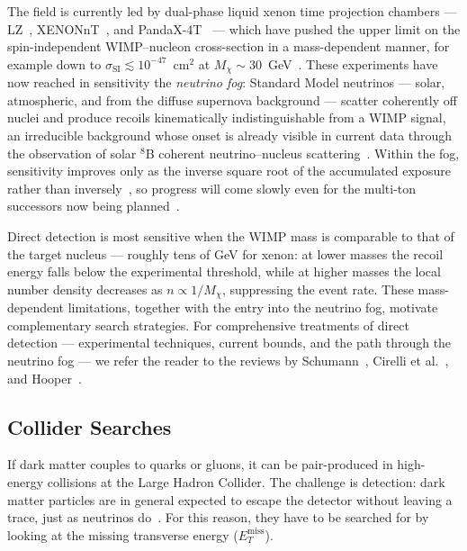 The field is currently led by dual-phase liquid xenon time projection chambers --- LZ~\cite{LZ:2022lsv}, XENONnT~\cite{XENON:2023cxc}, and PandaX-4T~\cite{PandaX-4T:2021bab} --- which have pushed the upper limit on the spin-independent WIMP--nucleon cross-section in a mass-dependent manner, for example down to $\sigma_\text{SI} \lesssim 10^{-47}$~cm$^2$ at $M_\chi \sim 30$~GeV~\cite{LZ:2024zvo}.
These experiments have now reached in sensitivity the \emph{neutrino fog}: Standard Model neutrinos --- solar, atmospheric, and from the diffuse supernova background --- scatter coherently off nuclei and produce recoils kinematically indistinguishable from a WIMP signal, an irreducible background whose onset is already visible in current data through the observation of solar $^8$B coherent neutrino--nucleus scattering~\cite{XENON:2020gfr,PandaX:2024muv,XENON:2024hup,LZ:2024zvo}.
Within the fog, sensitivity improves only as the inverse square root of the accumulated exposure rather than inversely~\cite{OHare:2021utq}, so progress will come slowly even for the multi-ton successors now being planned~\cite{DARWIN:2016hyl}.

Direct detection is most sensitive when the WIMP mass is comparable to that of the target nucleus --- roughly tens of GeV for xenon: at lower masses the recoil energy falls below the experimental threshold, while at higher masses the local number density decreases as $n \propto 1/M_\chi$, suppressing the event rate.
These mass-dependent limitations, together with the entry into the neutrino fog, motivate complementary search strategies.
For comprehensive treatments of direct detection --- experimental techniques, current bounds, and the path through the neutrino fog --- we refer the reader to the reviews by Schumann~\cite{Schumann:2019eaa}, Cirelli et al.~\cite{Cirelli:2024ssz}, and Hooper~\cite{Hooper:2024}.

\subsection{Collider Searches}
\label{sec:1.3.2}

If dark matter couples to quarks or gluons, it can be pair-produced in high-energy collisions at the Large Hadron Collider.
The challenge is detection: dark matter particles are in general expected to escape the detector without leaving a trace, just as neutrinos do~\cite{Cirelli:2024ssz}.
For this reason, they have to be searched for by looking at the missing transverse energy ($E_T^\text{miss}$).

